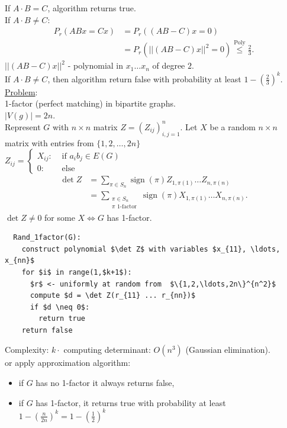 \documentclass[a4paper, 12pt]{book}
\theoremstyle{definition}
\theoremstyle{remark}
\DeclareMathOperator{\sign}{sign}
\begin{document}
If $A \cdot B = C$, algorithm returns true. \\
If $A \cdot B \neq C$: \\
\begin{align*}
  P_r(ABx = Cx) &= P_r((AB-C)x = 0) \\
  &= P_r\left(||(AB-C)x||^2 = 0\right) \stackrel{\text{Poly}}{\leq} \frac{2}{3}.
\end{align*}
$||(AB-C)x||^2$ - polynomial in $x_1 \dots x_n$ of degree $2$. \\
If $A \cdot B \neq C$, then algorithm return false with probability at least $1 - \left(\frac{2}{3}\right)^k$. \\
\underline{Problem}: \\
1-factor (perfect matching) in bipartite graphs. \\
$|V(g)| = 2n$. \\
Represent $G$ with $n \times n$ matrix $Z = (Z_{ij})_{i,j=1}^n$. Let $X$ be a random $n \times n$ matrix with entries from  $\{1,2,\ldots,2n\}$\\
$Z_{ij} = \begin{cases}
  X_{ij}: &\text{ if } a_i b_j \in E(G) \\
  0: &\text{ else}
\end{cases}$ \\
\begin{align*}
  \det Z &= \sum_{\pi \in S_n} \sign(\pi) Z_{1,\pi(1)} \dots Z_{n,\pi(n)} \\
  &= \sum_{\substack{\pi \in S_n\\ \pi \text{ 1-factor}}} \sign(\pi) X_{1,\pi(1)} \dots X_{n,\pi(n)}.
\end{align*}
$\det Z \neq 0$ for some $X \iff G$ has 1-factor.
\begin{lstlisting}
  Rand_1factor(G):
    construct polynomial $\det Z$ with variables $x_{11}, \ldots, x_{nn}$
    for $i$ in range(1,$k+1$):
      $r$ <- uniformly at random from  $\{1,2,\ldots,2n\}^{n^2}$
      compute $d = \det Z(r_{11} ... r_{nn})$
      if $d \neq 0$:
        return true
    return false
\end{lstlisting}
Complexity: $k \cdot$ computing determinant: $O\left(n^3\right)$ (Gaussian elimination). \\
or apply approximation algorithm:
\begin{itemize}
  \item if $G$ has no 1-factor it always returns false,
  \item if $G$ has 1-factor, it returns true with probability at least \\
    $1-\left(\frac{n}{2n}\right)^k = 1 - \left(\frac{1}{2}\right)^k$
\end{itemize}
\end{document}

